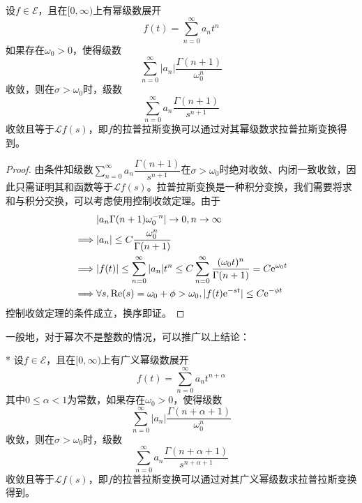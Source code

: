 \begin{theorem}[拉普拉斯变换的级数求法]
    设$f\in\mathcal{E} $，且在$[0,\infty)$上有幂级数展开
    \[f(t)=\sum_{n=0}^{\infty}a_n t^n\]
    如果存在$\omega_0>0$，使得级数
    \[\sum_{n=0}^{\infty}|a_n|\frac{\Gamma(n+1)}{\omega_0^{n}}\]
    收敛，则在$\sigma>\omega_0$时，级数
    \[\sum_{n=0}^{\infty}a_n \frac{\Gamma(n+1)}{s^{n+1}}\]
    收敛且等于$\mathcal{L} f(s)$，即$f$的拉普拉斯变换可以通过对其幂级数求拉普拉斯变换得到。
\end{theorem}
\begin{proof}
    由条件知级数$\sum_{n=0}^{\infty}a_n \dfrac{\Gamma(n+1)}{s^{n+1}}$在$\sigma>\omega_0$时绝对收敛、内闭一致收敛，因此只需证明其和函数等于$\mathcal{L} f(s)$。拉普拉斯变换是一种积分变换，我们需要将求和与积分交换，可以考虑使用控制收敛定理。由于
    \begin{align*}
        &|a_n \Gamma(n+1)\omega_0^{-n}|\to 0, n\to\infty\\
        \implies &|a_n|\leq C\frac{\omega_0^{n}}{\Gamma(n+1)}\\
        \implies &|f(t)|\leq \sum_{n=0}^{\infty}|a_n|t^n\leq C\sum_{n=0}^{\infty}\frac{(\omega_0 t)^{n}}{\Gamma(n+1)}=C\mathrm{e}^{\omega_0 t}\\
        \implies &\forall s,\mathrm{Re}(s)=\omega_0+\phi>\omega_0,|f(t)\mathrm{e}^{-s t}|\leq C\mathrm{e}^{-\phi t}
    \end{align*}
    控制收敛定理的条件成立，换序即证。
\end{proof}

一般地，对于幂次不是整数的情况，可以推广以上结论：
\begin{corollary}*
   设$f\in\mathcal{E} $，且在$[0,\infty)$上有广义幂级数展开
   \[f(t)=\sum_{n=0}^{\infty}a_n t^{n+\alpha}\]
   其中$0\leq\alpha<1$为常数，如果存在$\omega_0>0$，使得级数
   \[\sum_{n=0}^{\infty}|a_n|\frac{\Gamma(n+\alpha+1)}{\omega_0^{n}}\]
   收敛，则在$\sigma>\omega_0$时，级数
   \[\sum_{n=0}^{\infty}a_n \frac{\Gamma(n+\alpha+1)}{s^{n+\alpha+1}}\]
   收敛且等于$\mathcal{L} f(s)$，即$f$的拉普拉斯变换可以通过对其广义幂级数求拉普拉斯变换得到。
\end{corollary}

